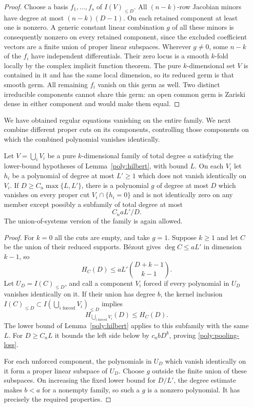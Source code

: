 \begin{proof}
Choose a basis $f_1,\ldots,f_s$ of $I(V)_{\le D}$.  All
$(n-k)$-row Jacobian minors have degree at most $(n-k)(D-1)$.
On each retained component at least one is nonzero.  A generic
constant linear combination $g$ of all these minors is consequently
nonzero on every retained component, since the excluded coefficient
vectors are a finite union of proper linear subspaces.  Wherever
$g\ne0$, some $n-k$ of the $f_i$ have independent differentials.
Their zero locus is a smooth $k$-fold locally by the complex
implicit function theorem.  The pure $k$-dimensional set $V$ is
contained in it and has the same local dimension, so its reduced
germ is that smooth germ.  All remaining $f_i$ vanish on this germ
as well.  Two distinct irreducible components cannot share this
germ: an open common germ is Zariski dense in either component and
would make them equal.
\end{proof}

We have obtained regular equations vanishing on the entire family.
We next combine different proper cuts on its components, controlling
those components on which the combined polynomial vanishes identically.

\begin{lemma}\label{poly:pooling}
Let $V=\bigcup_iV_i$ be a pure $k$-dimensional family of total
degree $a$ satisfying the lower-bound hypotheses of
Lemma~\ref{poly:hilbert}, with bound $L$.  On each $V_i$ let
$h_i$ be a polynomial of degree at most $L'\ge1$ which does not
vanish identically on $V_i$.  If
$D\ge C_n\max\{L,L'\}$, there is a polynomial $g$ of degree at
most $D$ which vanishes on every proper cut $V_i\cap\{h_i=0\}$
and is not identically zero on any member except possibly a
subfamily of total degree at most
\begin{equation}\label{poly:pooling-loss}
 C_n aL'/D.
\end{equation}
The union-of-systems version of the family is again allowed.
\end{lemma}

\begin{proof}
For $k=0$ all the cuts are empty, and take $g=1$.  Suppose $k\ge1$
and let $C$ be the union of their reduced supports.  B\'ezout gives
$\deg C\le aL'$ in dimension $k-1$, so
\[
 H_C(D)\le aL'\binom{D+k-1}{k-1}.
\]
Let $U_D=I(C)_{\le D}$, and call a component $V_i$ forced if every
polynomial in $U_D$ vanishes identically on it.  If their union has
degree $b$, the kernel inclusion
$I(C)_{\le D}\subset I(\bigcup_{i\text{ forced}}V_i)_{\le D}$
implies
\[
 H_{\bigcup_{i\text{ forced}}V_i}(D)\le H_C(D).
\]
The lower bound of Lemma~\ref{poly:hilbert} applies to this
subfamily with the same $L$.  For $D\ge C_nL$ it bounds the left
side below by $c_n bD^k$, proving \eqref{poly:pooling-loss}.

For each unforced component, the polynomials in $U_D$ which vanish
identically on it form a proper linear subspace of $U_D$.  Choose
$g$ outside the finite union of these subspaces.  On increasing
the fixed lower bound for $D/L'$, the degree estimate makes
$b<a$ for a nonempty family, so such a $g$ is a nonzero polynomial.
It has precisely the required properties.
\end{proof}

